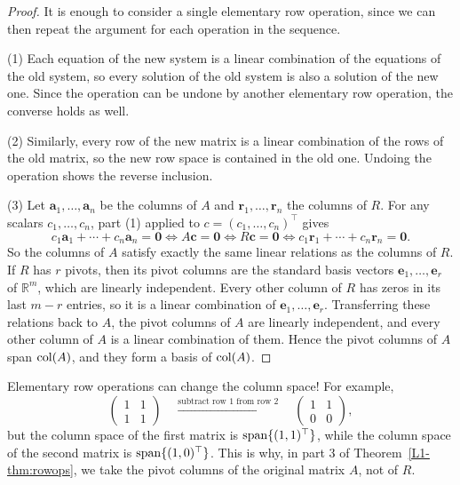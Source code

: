 \begin{proof}
    It is enough to consider a single elementary row operation, since we can then repeat the argument for each operation in the sequence.

    (1) Each equation of the new system is a linear combination of the equations of the old system, so every solution of the old system is also a solution of the new one. Since the operation can be undone by another elementary row operation, the converse holds as well.

    (2) Similarly, every row of the new matrix is a linear combination of the rows of the old matrix, so the new row space is contained in the old one. Undoing the operation shows the reverse inclusion.

    (3) Let $\mathbf{a}_1, \ldots, \mathbf{a}_n$ be the columns of $A$ and $\mathbf{r}_1, \ldots, \mathbf{r}_n$ the columns of $R$. For any scalars $c_1, \ldots, c_n$, part (1) applied to $c = (c_1, \ldots, c_n)^\top$ gives
    \[c_1 \mathbf{a}_1 + \cdots + c_n \mathbf{a}_n = \mathbf{0} \iff A\mathbf{c} = \mathbf{0} \iff R\mathbf{c} = \mathbf{0} \iff c_1 \mathbf{r}_1 + \cdots + c_n \mathbf{r}_n = \mathbf{0}.\]
    So the columns of $A$ satisfy exactly the same linear relations as the columns of $R$. If $R$ has $r$ pivots, then its pivot columns are the standard basis vectors $\mathbf{e}_1, \ldots, \mathbf{e}_r$ of $\mathbb{R}^m$, which are linearly independent. Every other column of $R$ has zeros in its last $m - r$ entries, so it is a linear combination of $\mathbf{e}_1, \ldots, \mathbf{e}_r$. Transferring these relations back to $A$, the pivot columns of $A$ are linearly independent, and every other column of $A$ is a linear combination of them. Hence the pivot columns of $A$ span $\operatorname{col}(A)$, and they form a basis of $\operatorname{col}(A)$.
\end{proof}

\begin{remark}
    Elementary row operations can change the column space! For example,
    \[\begin{pmatrix}
        1 & 1 \\
        1 & 1
    \end{pmatrix} \quad \xrightarrow{\text{subtract row 1 from row 2}} \quad \begin{pmatrix}
        1 & 1 \\
        0 & 0
    \end{pmatrix},\]
    but the column space of the first matrix is $\operatorname{span}\{(1, 1)^\top\}$, while the column space of the second matrix is $\operatorname{span}\{(1, 0)^\top\}$. This is why, in part 3 of Theorem~\ref{L1-thm:rowops}, we take the pivot columns of the original matrix $A$, not of $R$.
\end{remark}

